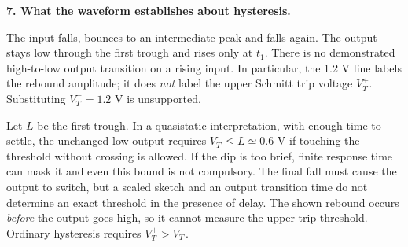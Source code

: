 \documentclass[10pt]{article}
\newcommand{\mos}[4]{\begin{scope}[shift={(#1,#2)}]
\draw (0,.24)--(0,-.24);\draw (0,.20)--(.25,.20)--(.25,.5);
\draw (0,-.20)--(.25,-.20)--(.25,-.5);\draw (-.16,.23)--(-.16,-.23);
\ifnum#4=1\draw (-.26,0) circle (.06);\draw (-.75,0)--(-.32,0);\else\draw (-.75,0)--(-.16,0);\fi
\node[anchor=east,font=\scriptsize] at (-.76,0) {$#3$};\end{scope}}
\newcommand{\ground}[2]{\draw (#1,#2)--(#1,{#2-.12});\draw ({#1-.17},{#2-.12})--({#1+.17},{#2-.12});\draw ({#1-.11},{#2-.20})--({#1+.11},{#2-.20});}
\newcommand{\rail}[3]{\draw (#1,#2)--(#1,{#2+.14});\node[above,font=\scriptsize] at (#1,{#2+.14}) {$#3$};}
\newcommand{\hmos}[4]{\begin{scope}[shift={(#1,#2)}]
\draw(-.24,0)--(.24,0);\draw(-.2,0)--(-.2,-.25)--(-.5,-.25);\draw(.2,0)--(.2,-.25)--(.5,-.25);
\draw(-.23,.16)--(.23,.16);
\ifnum#4=1\draw(0,.26)circle(.06);\draw(0,.32)--(0,.75);\else\draw(0,.16)--(0,.75);\fi
\node[below,font=\scriptsize]at(0,-.32){#3};\end{scope}}
\begin{document}
\newpage\textbf{7. What the waveform establishes about hysteresis.}
\begin{center}\end{center}
The input falls, bounces to an intermediate peak and falls again. The output stays low through the first trough and rises only at $t_1$. There is no demonstrated high-to-low output transition on a rising input. In particular, the 1.2 V line labels the rebound amplitude; it does \emph{not} label the upper Schmitt trip voltage $V_T^+$. Substituting $V_T^+=1.2$ V is unsupported.

Let $L$ be the first trough. In a quasistatic interpretation, with enough time to settle, the unchanged low output requires $V_T^-\leq L\simeq0.6$ V if touching the threshold without crossing is allowed. If the dip is too brief, finite response time can mask it and even this bound is not compulsory. The final fall must cause the output to switch, but a scaled sketch and an output transition time do not determine an exact threshold in the presence of delay. The shown rebound occurs \emph{before} the output goes high, so it cannot measure the upper trip threshold. Ordinary hysteresis requires $V_T^+>V_T^-$.
\end{document}
